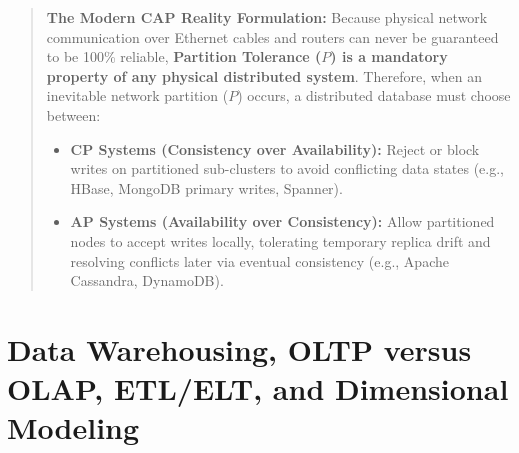 \begin{quote}
\textbf{The Modern CAP Reality Formulation:}
Because physical network communication over Ethernet cables and routers can never be guaranteed to be 100\% reliable, \textbf{Partition Tolerance ($P$) is a mandatory property of any physical distributed system}. Therefore, when an inevitable network partition ($P$) occurs, a distributed database must choose between:
\begin{itemize}
    \item \textbf{CP Systems (Consistency over Availability):} Reject or block writes on partitioned sub-clusters to avoid conflicting data states (e.g., HBase, MongoDB primary writes, Spanner).
    \item \textbf{AP Systems (Availability over Consistency):} Allow partitioned nodes to accept writes locally, tolerating temporary replica drift and resolving conflicts later via eventual consistency (e.g., Apache Cassandra, DynamoDB).
\end{itemize}
\end{quote}

\section{Data Warehousing, OLTP versus OLAP, ETL/ELT, and Dimensional Modeling}
\label{sec:dbms_oltp_olap}

